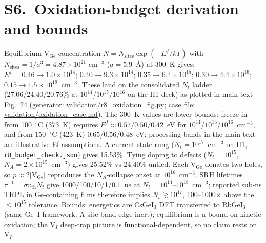 \documentclass[11pt]{article}
\begin{document}
\section*{S6.\ Oxidation-budget derivation and bounds}
Equilibrium V$_{\mathrm{Ge}}$ concentration $N=N_{\mathrm{sites}}\exp(-E^f/kT)$ with $N_{\mathrm{sites}}=1/a^3=4.87\times10^{21}$ cm$^{-3}$ ($a=5.9$~\AA) at 300~K gives: $E^f=0.46\rightarrow1.0\times10^{14}$; $0.40\rightarrow9.3\times10^{14}$; $0.35\rightarrow6.4\times10^{15}$; $0.30\rightarrow4.4\times10^{16}$; $0.15\rightarrow1.5\times10^{19}$~cm$^{-3}$. These land on the consolidated $N_t$ ladder (27.06/24.40/20.76\% at $10^{14}$/$10^{15}$/$10^{16}$ on the H1 deck) as plotted in main-text Fig.~24 (generator: \url{validation/r8_oxidation_fig.py}; case file: \url{validation/oxidation_case.md}). The 300~K values are lower bounds: freeze-in from 100~$^{\circ}$C (373~K) requires $E^f\approx0.57/0.50/0.42$~eV for $10^{14}$/$10^{15}$/$10^{16}$~cm$^{-3}$, and from 150~$^{\circ}$C (423~K) $0.65$/$0.56$/$0.48$~eV; processing bands in the main text are illustrative Ef assumptions. A current-state rung ($N_t=10^{17}$~cm$^{-3}$ on H1, \texttt{r8\_budget\_check.json}) gives 15.53\%. Tying doping to defects ($N_t=10^{15}$, $N_A=2\times10^{15}$~cm$^{-3}$) gives 25.52\% vs 24.40\% untied. Each V$_{\mathrm{Ge}}$ donates two holes, so $p\approx2$[V$_{\mathrm{Ge}}$] reproduces the $N_A$-collapse onset at $10^{16}$~cm$^{-3}$. SRH lifetimes $\tau^{-1}=\sigma v_{\mathrm{th}}N_t$ give 1000/100/10/1/0.1~ns at $N_t=10^{14}$--$10^{18}$~cm$^{-3}$; reported sub-ns TRPL in Ge-containing films \cite{rGeRev} therefore implies $N_t\gtrsim10^{17}$, 100--1000$\times$ above the $\le10^{15}$ tolerance. Bounds: energetics are CsGeI$_{3}$ DFT transferred to RbGeI$_{3}$ (same Ge--I framework; A-site band-edge-inert); equilibrium is a bound on kinetic oxidation; the V$_{I}$ deep-trap picture is functional-dependent, so no claim rests on V$_{I}$.
\end{document}
